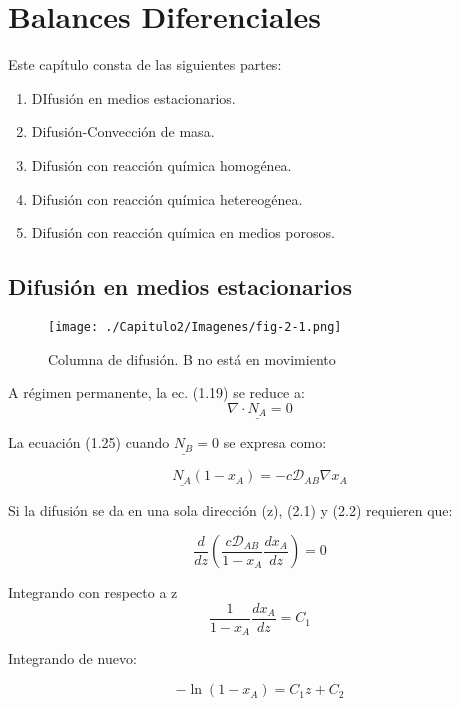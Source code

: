 \chapter{Balances Diferenciales}
Este capítulo consta de las siguientes partes:
\begin{enumerate}
	\item DIfusión en medios estacionarios.
	\item Difusión-Convección de masa.
	\item Difusión con reacción química homogénea.
	\item Difusión con reacción química hetereogénea.
	\item Difusión con reacción química en medios porosos.
\end{enumerate}

\section{Difusión en medios estacionarios}

\begin{figure}[H]
	\centering 
	\texttt{[image: ./Capitulo2/Imagenes/fig-2-1.png]}
	\caption{Columna de difusión. B no está en movimiento}
\end{figure}

A régimen permanente, la ec. (1.19) se reduce a:
\begin{equation}
\nabla \cdot \underline{N_A} = 0
\end{equation}

La ecuación (1.25) cuando $\underline{N_B} = 0$ se expresa como:

\begin{equation}
\underline{N_A} (1-x_A) = - c \mathscr{D}_{AB} \nabla x_A
\end{equation}

Si la difusión se da en una sola dirección (z), (2.1) y (2.2) requieren que:

\begin{equation}
	\frac{d}{dz} \left( \frac{c \mathscr{D}_{AB}}{1-x_A} \frac{dx_A}{dz} \right) = 0
\end{equation}

Integrando con respecto a z
$$
	\frac{1}{1-x_A} \frac{dx_A}{dz} = C_1
$$

Integrando de nuevo: 

\begin{equation}
- \ln{(1-x_A)} = C_1 z +C_2
\end{equation}

